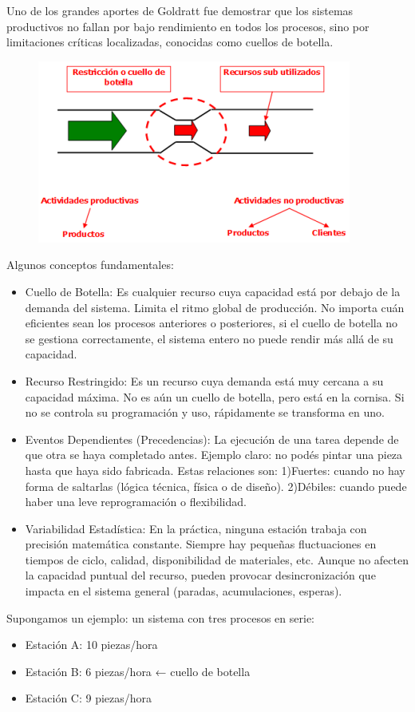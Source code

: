 \documentclass[a4paper,oneside,11pt]{article}
\begin{document}
Uno de los grandes aportes de Goldratt fue demostrar que los sistemas productivos no fallan por bajo rendimiento en todos los procesos, sino por limitaciones críticas localizadas, conocidas como cuellos de botella.
\begin{figure}[ht!]
    \centering
    \includegraphics[width=0.65\linewidth]{image.png}
\end{figure}
Algunos conceptos fundamentales:

\begin{itemize}
    \item Cuello de Botella: Es cualquier recurso cuya capacidad está por debajo de la demanda del sistema. Limita el ritmo global de producción. No importa cuán eficientes sean los procesos anteriores o posteriores, si el cuello de botella no se gestiona correctamente, el sistema entero no puede rendir más allá de su capacidad.
    \item Recurso Restringido: Es un recurso cuya demanda está muy cercana a su capacidad máxima. No es aún un cuello de botella, pero está en la cornisa. Si no se controla su programación y uso, rápidamente se transforma en uno.
    \item Eventos Dependientes (Precedencias): La ejecución de una tarea depende de que otra se haya completado antes. Ejemplo claro: no podés pintar una pieza hasta que haya sido fabricada. Estas relaciones son: 1)Fuertes: cuando no hay forma de saltarlas (lógica técnica, física o de diseño). 2)Débiles: cuando puede haber una leve reprogramación o flexibilidad.
    \item Variabilidad Estadística: En la práctica, ninguna estación trabaja con precisión matemática constante. Siempre hay pequeñas fluctuaciones en tiempos de ciclo, calidad, disponibilidad de materiales, etc. Aunque no afecten la capacidad puntual del recurso, pueden provocar desincronización que impacta en el sistema general (paradas, acumulaciones, esperas).
\end{itemize}

Supongamos un ejemplo: un sistema con tres procesos en serie:
\begin{itemize}
    \item Estación A: 10 piezas/hora
    \item Estación B: 6 piezas/hora ← cuello de botella
    \item Estación C: 9 piezas/hora
\end{itemize}
\end{document}
